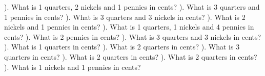 \documentclass{article}%
\begin{document}
\newline%
). What is 1 quarters, 2 nickels and 1 pennies in cents?%
\newline%
\newline%
). What is 3 quarters and 1 pennies in cents?%
\newline%
\newline%
). What is 3 quarters and 3 nickels in cents?%
\newline%
\newline%
). What is 2 nickels and 1 pennies in cents?%
\newline%
\newline%
). What is 1 quarters, 1 nickels and 4 pennies in cents?%
\newline%
\newline%
). What is 2 pennies in cents?%
\newline%
\newline%
). What is 3 quarters and 3 nickels in cents?%
\newline%
\newline%
). What is 1 quarters in cents?%
\newline%
\newline%
). What is 2 quarters in cents?%
\newline%
\newline%
). What is 3 quarters in cents?%
\newline%
\newline%
). What is 2 quarters in cents?%
\newline%
\newline%
). What is 2 quarters in cents?%
\newline%
\newline%
). What is 1 nickels and 1 pennies in cents?%
\newline%
\newline%
\newline%
\end{document}
